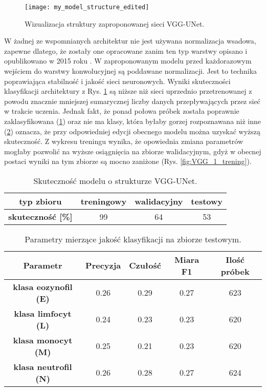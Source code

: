 \begin{figure}[h]
	\centering
	\centering
		\texttt{[image: my\_model\_structure\_edited]}	
	\caption{Wizualizacja struktury zaproponowanej sieci VGG-UNet.}
	\label{fig:vgg_unet_visualisation}
\end{figure}

{\parindent0pt
W żadnej ze wspomnianych architektur nie jest używana normalizacja wsadowa, zapewne dlatego, że zostały one opracowane zanim ten typ warstwy opisano i opublikowano w 2015 roku \cite{batch_normalisation}. W zaproponowanym modelu przed każdorazowym wejściem do warstwy konwolucyjnej są poddawane normalizacji. Jest to technika poprawiająca stabilność i jakość sieci neuronowych. Wyniki skuteczności klasyfikacji architektury z Rys. \ref{fig:vgg_unet_visualisation} są niższe niż sieci uprzednio przetrenowanej z powodu znacznie mniejszej sumarycznej liczby danych przepływających przez sieć w trakcie uczenia. Jednak fakt, że ponad połowa próbek została poprawnie zaklasyfikowana (\ref{tab:VGG_1_acc}) oraz nie ma klasy, która byłaby gorzej rozpoznawana niż inne (\ref{tab:VGG_1_params_val}) oznacza, że przy odpowiedniej edycji obecnego modelu można uzyskać wyższą skuteczność. Z wykresu treningu wynika, że opowiednia zmiana parametrów mogłaby pozwolić na wyższe osiągnięcia na zbiorze walidacyjnym, gdyż w obecnej postaci wyniki na tym zbiorze są mocno zaniżone (Rys. \ref{fig:VGG_1_trening}).

 \begin{table}[h!]
\centering
\caption[Short Heading]{Skuteczność modelu o strukturze VGG-UNet.}
\label{tab:VGG_1_acc}
\begin{tabular}{|c|c|c|c|}
\hline
\textbf{typ zbioru}           & \textbf{treningowy} & \textbf{walidacyjny} & \textbf{testowy} \\ \hline
\textbf{skuteczność {[}\%{]}} & 99                  & 64                   & 53               \\ \hline
\end{tabular}
\end{table}

\begin{table}[h!]
\centering
\caption[Short Heading]{Parametry mierzące jakość klasyfikacji na zbiorze testowym.}
\label{tab:VGG_1_params_val}
\begin{tabular}{|c|c|c|c|c|}
\hline
\textbf{Parametr}                               & \textbf{Precyzja} & \textbf{Czułość} & \textbf{Miara F1} & \textbf{Ilość próbek} \\ \hline
\textbf{klasa eozynofil (E)} & 0.26   & 0.29   & 0.27 & 623  \\ \hline
\textbf{klasa limfocyt (L)} & 0.24  & 0.23 & 0.23  & 620  \\ \hline
\textbf{klasa monocyt (M)} & 0.25   & 0.21    & 0.23  & 620  \\ \hline
\textbf{klasa neutrofil (N)} & 0.26   & 0.28    & 0.27  & 624  \\ \hline
\end{tabular}
\end{table}

}
